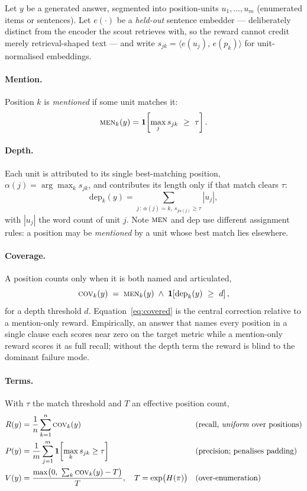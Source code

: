 \documentclass[11pt]{article}
\newcommand{\Ind}[1]{\mathbf{1}\!\left[#1\right]}
\begin{document}
Let $y$ be a generated answer, segmented into position-units
$u_1,\dots,u_m$ (enumerated items or sentences). Let $e(\cdot)$ be a
\emph{held-out} sentence embedder --- deliberately distinct from the encoder
the scout retrieves with, so the reward cannot credit merely
retrieval-shaped text --- and write
$s_{jk}=\langle e(u_j),\,e(p_k)\rangle$ for unit-normalised embeddings.

\paragraph{Mention.} Position $k$ is \emph{mentioned} if some unit matches it:
\[
  \textsc{men}_k(y)=\Ind{\max_j s_{jk}\ \ge\ \tau }.
\]

\paragraph{Depth.} Each unit is attributed to its single best-matching position,
$\alpha(j)=\arg\max_k s_{jk}$, and contributes its length only if that match
clears $\tau$:
\[
  \mathrm{dep}_k(y)=\sum_{j\,:\,\alpha(j)=k,\ s_{j\alpha(j)}\ge\tau} |u_j| ,
\]
with $|u_j|$ the word count of unit $j$. Note $\textsc{men}$ and $\mathrm{dep}$
use different assignment rules: a position may be \emph{mentioned} by a unit
whose best match lies elsewhere.

\paragraph{Coverage.} A position counts only when it is both named and
articulated,
\begin{equation}\label{eq:covered}
  \textsc{cov}_k(y)\;=\;\textsc{men}_k(y)\;\wedge\;\Ind{\mathrm{dep}_k(y)\ \ge\ d},
\end{equation}
for a depth threshold $d$. Equation~\eqref{eq:covered} is the central
correction relative to a mention-only reward. Empirically, an answer that names
every position in a single clause each scores near zero on the target metric
while a mention-only reward scores it as full recall; without the depth term the
reward is blind to the dominant failure mode.

\paragraph{Terms.} With $\tau$ the match threshold and $T$ an effective position
count,
\begin{align}
  R(y) &= \frac{1}{n}\sum_{k=1}^{n}\textsc{cov}_k(y)
        &&\text{(recall, \emph{uniform} over positions)}\\
  P(y) &= \frac{1}{m}\sum_{j=1}^{m}\Ind{\max_k s_{jk}\ge\tau}
        &&\text{(precision; penalises padding)}\\
  V(y) &= \frac{\max\!\big(0,\ \textstyle\sum_k \textsc{cov}_k(y)-T\big)}{T},
        \quad T=\exp\!\big(H(\pi)\big)
        &&\text{(over-enumeration)}
\end{align}
\end{document}
